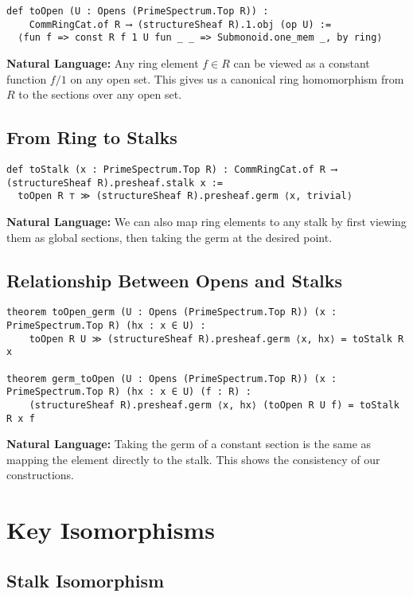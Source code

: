 \documentclass{article}
\theoremstyle{definition}
\begin{document}
\begin{lstlisting}
def toOpen (U : Opens (PrimeSpectrum.Top R)) :
    CommRingCat.of R ⟶ (structureSheaf R).1.obj (op U) :=
  ⟨fun f => const R f 1 U fun _ _ => Submonoid.one_mem _, by ring⟩
\end{lstlisting}

\textbf{Natural Language:} Any ring element $f \in R$ can be viewed as a constant function $f/1$ on any open set. This gives us a canonical ring homomorphism from $R$ to the sections over any open set.

\subsection{From Ring to Stalks}

\begin{lstlisting}
def toStalk (x : PrimeSpectrum.Top R) : CommRingCat.of R ⟶ (structureSheaf R).presheaf.stalk x :=
  toOpen R ⊤ ≫ (structureSheaf R).presheaf.germ ⟨x, trivial⟩
\end{lstlisting}

\textbf{Natural Language:} We can also map ring elements to any stalk by first viewing them as global sections, then taking the germ at the desired point.

\subsection{Relationship Between Opens and Stalks}

\begin{lstlisting}
theorem toOpen_germ (U : Opens (PrimeSpectrum.Top R)) (x : PrimeSpectrum.Top R) (hx : x ∈ U) :
    toOpen R U ≫ (structureSheaf R).presheaf.germ ⟨x, hx⟩ = toStalk R x

theorem germ_toOpen (U : Opens (PrimeSpectrum.Top R)) (x : PrimeSpectrum.Top R) (hx : x ∈ U) (f : R) :
    (structureSheaf R).presheaf.germ ⟨x, hx⟩ (toOpen R U f) = toStalk R x f
\end{lstlisting}

\textbf{Natural Language:} Taking the germ of a constant section is the same as mapping the element directly to the stalk. This shows the consistency of our constructions.

\section{Key Isomorphisms}

\subsection{Stalk Isomorphism}
\end{document}
